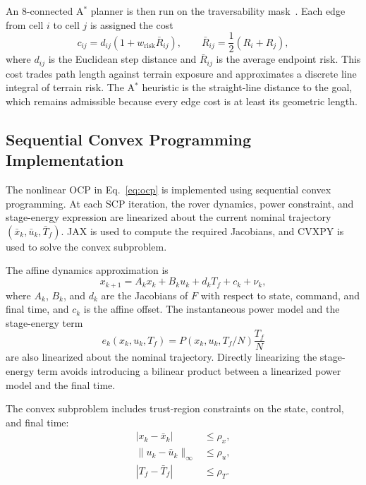\documentclass[conf]{new-aiaa}
\begin{document}
An 8-connected A$^\ast$ planner is then run on the traversability mask~\cite{hart1968astar}. Each edge from cell $i$ to cell $j$ is assigned the cost
\begin{equation}
    c_{ij}=d_{ij}\left(1+w_{\mathrm{risk}}\bar{R}_{ij}\right),
    \qquad
    \bar{R}_{ij}=\frac{1}{2}\left(R_i+R_j\right),
\end{equation}
where $d_{ij}$ is the Euclidean step distance and $\bar{R}_{ij}$ is the average endpoint risk. This cost trades path length against terrain exposure and approximates a discrete line integral of terrain risk. The A$^\ast$ heuristic is the straight-line distance to the goal, which remains admissible because every edge cost is at least its geometric length.

\subsection{Sequential Convex Programming Implementation}
The nonlinear OCP in Eq.~\eqref{eq:ocp} is implemented using sequential convex programming. At each SCP iteration, the rover dynamics, power constraint, and stage-energy expression are linearized about the current nominal trajectory $(\bar{x}_k,\bar{u}_k,\bar{T}_f)$. JAX \cite{jax2018github} is used to compute the required Jacobians, and CVXPY \cite{diamond2016cvxpy} is used to solve the convex subproblem.

The affine dynamics approximation is
\begin{equation}
    x_{k+1}=A_kx_k+B_ku_k+d_kT_f+c_k+\nu_k,
\end{equation}
where $A_k$, $B_k$, and $d_k$ are the Jacobians of $F$ with respect to state, command, and final time, and $c_k$ is the affine offset. The instantaneous power model and the stage-energy term
\begin{equation}
    e_k(x_k,u_k,T_f)=P(x_k,u_k,T_f/N)\frac{T_f}{N}
\end{equation}
are also linearized about the nominal trajectory. Directly linearizing the stage-energy term avoids introducing a bilinear product between a linearized power model and the final time.

The convex subproblem includes trust-region constraints on the state, control, and final time:
\begin{align}
    |x_k-\bar{x}_k| &\leq \rho_x,\\
    \|u_k-\bar{u}_k\|_\infty &\leq \rho_u,\\
    |T_f-\bar{T}_f| &\leq \rho_T .
\end{align}
\end{document}
